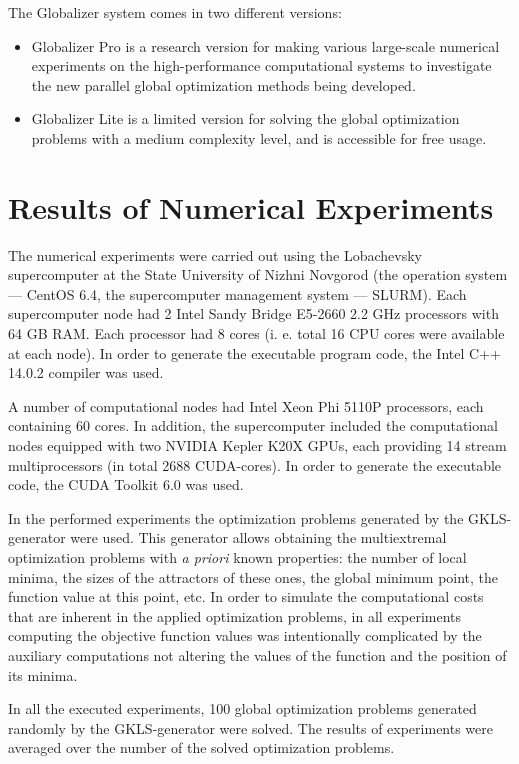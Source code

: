 \documentclass{naco}
\theoremstyle{definition}
\begin{document}
\par
The Globalizer system comes in two different versions:
\begin{itemize}
  \item Globalizer Pro is a research version for making various large-scale numerical experiments on the high-performance computational systems to investigate the new parallel global optimization methods being developed.
  \item Globalizer Lite is a limited version for solving the global optimization problems with a medium complexity level, and is accessible for free usage.
\end{itemize}

\section{Results of Numerical Experiments}
\label{sec:experiments}
The numerical experiments were carried out using the Lobachevsky supercomputer at
the State University of Nizhni Novgorod (the operation system --- CentOS 6.4, the
supercomputer management system --- SLURM). Each supercomputer node had 2 Intel Sandy Bridge
E5-2660 2.2 GHz processors with 64 GB RAM. Each processor had 8 cores (i. e. total
16 CPU cores were available at each node). In order to generate the executable program code, the Intel C++ 14.0.2 compiler was used.
\par
A number of computational nodes had Intel Xeon Phi 5110P processors, each containing 60 cores. In addition, the supercomputer included the computational nodes equipped
with two NVIDIA Kepler K20X GPUs, each providing 14 stream multiprocessors (in total 2688 CUDA-cores). In order to generate the executable code, the CUDA Toolkit 6.0 was used.
\par
In the performed experiments the optimization problems generated by the GKLS-generator
\cite{gavianoKvasovLeraSergeev2003} were used. This generator allows obtaining the multiextremal optimization
problems with \textit{a priori} known properties: the number of local minima, the sizes of the attractors of these ones, the global minimum point, the function value at this point, etc. In order to simulate the computational costs that are inherent in the applied optimization problems, in all experiments computing the objective function values was intentionally complicated by the auxiliary computations not altering the values of the function and the position of its minima.
\par
In all the executed experiments, 100 global optimization problems generated randomly by the GKLS-generator were solved. The results of experiments were averaged over the number of the solved optimization problems.
\end{document}
